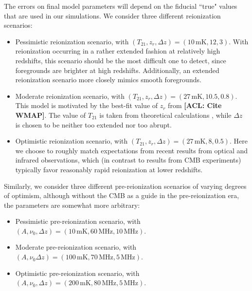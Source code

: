 \documentclass[twocolumn,apj,numberedappendix]{emulateapj}
\newcommand{\acl}[1]{{\color{red} \textbf{[ACL:  #1]}}}
\begin{document}
The errors on final model parameters will depend on the fiducial ``true" values that are used in our simulations. We consider three different reionization scenarios:
\begin{itemize}
\item Pessimistic reionization scenario, with $(T_{21}, z_r, \Delta z) = (10\,\textrm{mK}, 12, 3) $. With reionization occurring in a rather extended fashion at relatively high redshifts, this scenario should be the most difficult one to detect, since foregrounds are brighter at high redshifts. Additionally, an extended reionization scenario more closely mimics smooth foregrounds.
\item Moderate reionization scenario, with $(T_{21}, z_r, \Delta z) = (27\,\textrm{mK}, 10.5, 0.8) $. This model is motivated by the best-fit value of $z_r$ from \acl{Cite WMAP}. The value of $T_{21}$ is taken from theoretical calculations \citep{PritchardLoeb2010}, while $\Delta z$ is chosen to be neither too extended nor too abrupt.
\item Optimistic reionization scenario, with $(T_{21}, z_r, \Delta z) = (27\,\textrm{mK}, 8, 0.5) $. Here we choose to roughly match expectations from recent results from optical and infrared observations, which (in contrast to results from CMB experiments) typically favor reasonably rapid reionization at lower redshifts.
\end{itemize}
Similarly, we consider three different pre-reionization scenarios of varying degrees of optimism, although without the CMB as a guide in the pre-reionization era, the parameters are somewhat more arbitrary:
\begin{itemize}
\item Pessimistic pre-reionization scenario, with $(A, \nu_0, \Delta z) = (10\,\textrm{mK}, 60\,\textrm{MHz}, 10\,\textrm{MHz}) $.
\item Moderate pre-reionization scenario, with $(A, \nu_0 \Delta z) = (100\,\textrm{mK}, 70\,\textrm{MHz}, 5\,\textrm{MHz}) $.
\item Optimistic pre-reionization scenario, with $(A, \nu_0, \Delta z) = (200\,\textrm{mK}, 80\,\textrm{MHz}, 5\,\textrm{MHz}) $.
\end{itemize}
\end{document}
